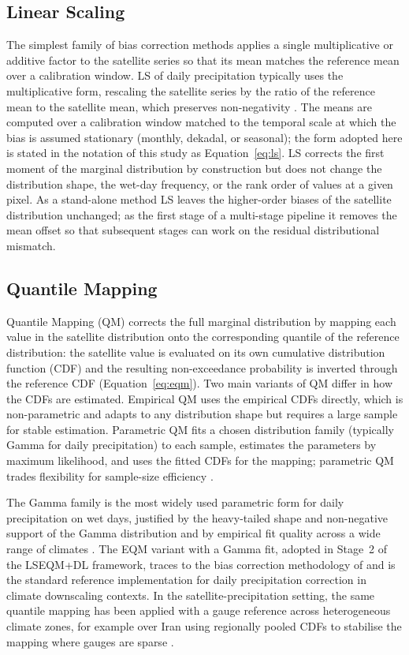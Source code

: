 \subsection{Linear Scaling}\label{sec:lit-ls}

The simplest family of bias correction methods applies a single
multiplicative or additive factor to the satellite series so
that its mean matches the reference mean over a calibration
window. LS of daily precipitation typically
uses the multiplicative form, rescaling the satellite series by
the ratio of the reference mean to the satellite mean, which
preserves non-negativity \citep{ref:teutschbein2012}. The means
are computed over a calibration window matched
to the temporal scale at which the bias is assumed stationary
(monthly, dekadal, or seasonal); the form adopted here is stated
in the notation of this study as
Equation~\eqref{eq:ls}. LS corrects the first moment
of the marginal distribution by construction but does not change
the distribution shape, the wet-day frequency, or the rank order
of values at a given pixel. As a stand-alone method LS leaves
the higher-order biases of the satellite distribution
unchanged; as the first stage of a multi-stage pipeline it
removes the mean offset so that subsequent stages can work on
the residual distributional mismatch.

\subsection{Quantile Mapping}\label{sec:lit-qm}

Quantile Mapping (QM) corrects the full marginal distribution
by mapping each value in the satellite distribution onto the
corresponding quantile of the reference distribution: the
satellite value is evaluated on its own cumulative distribution
function (CDF) and the resulting non-exceedance probability is
inverted through the reference CDF
(Equation~\eqref{eq:eqm}). Two main variants of QM differ in how the
CDFs are estimated. Empirical QM uses the empirical CDFs
directly, which is non-parametric and adapts to any
distribution shape but requires a large sample for stable
estimation. Parametric QM fits a chosen distribution family
(typically Gamma for daily precipitation) to each sample,
estimates the parameters by maximum likelihood, and uses the
fitted CDFs for the mapping; parametric QM trades flexibility
for sample-size efficiency \citep{ref:gudmundsson2012}.

The Gamma family is the most widely used parametric form for
daily precipitation on wet days, justified by the heavy-tailed
shape and non-negative support of the Gamma distribution and by
empirical fit quality across a wide range of climates
\citep{ref:wilks2020}. The EQM
variant with a Gamma fit, adopted in Stage~2 of the LSEQM+DL
framework, traces to the bias correction methodology of
\citet{ref:gudmundsson2012, ref:themessl2012} and is the
standard reference implementation for daily precipitation
correction in climate downscaling contexts. In the
satellite-precipitation setting, the same quantile mapping has
been applied with a gauge reference across heterogeneous climate
zones, for example over Iran using regionally pooled CDFs to
stabilise the mapping where gauges are sparse
\citep{ref:katiraie2020}.

